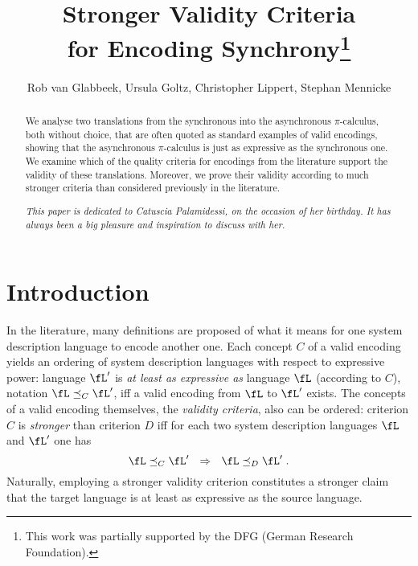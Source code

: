 \documentclass[runningheads]{llncs}
\begin{document}
\title{Stronger Validity Criteria\texorpdfstring{\\}{} for Encoding Synchrony\thanks{This work was partially supported by the DFG (German Research Foundation).}}
\author{Rob van Glabbeek, Ursula Goltz,
        Christopher Lippert, Stephan Mennicke}

\maketitle
\setcounter{footnote}{0}

\begin{abstract}
We analyse two translations from the synchronous into the asynchronous $\pi$-calculus, both without choice,
that are often quoted as standard examples of valid encodings, showing that the asynchronous
$\pi$-calculus is just as expressive as the synchronous one.
We examine which of the quality criteria for encodings from the literature support the validity
of these translations. Moreover, we prove their validity according to much stronger
criteria than considered previously in the literature.

\vspace{3ex}

\emph{This paper is dedicated to Catuscia Palamidessi, on the occasion of her birthday.
It has always been a big pleasure and inspiration to discuss with her.}
\end{abstract}

\section{Introduction}

In the literature, many definitions are proposed of what it means for one system description
language to encode another one. Each concept $C$ of a valid encoding yields an ordering of system
description languages with respect to expressive power: language $\fL'$ is \emph{at least as expressive as}
language $\fL$ (according to $C$), notation $\fL \preceq_C \fL'$, iff a valid encoding from $\fL$ to $\fL'$ exists.
The concepts of a valid encoding themselves, the \emph{validity criteria}, also can be ordered:
criterion $C$ is \emph{stronger} than criterion $D$ iff for each two system
description languages $\fL$ and $\fL'$ one has\vspace{-1ex}
            $$\fL \preceq_C \fL' ~~\Rightarrow~~ \fL \preceq_D \fL'\;.$$
Naturally, employing a stronger validity criterion constitutes a stronger claim that the
target language is at least as expressive as the source language.
\end{document}
